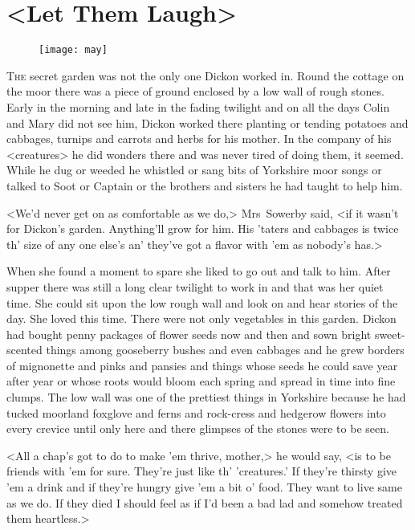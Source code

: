 \chapter{<Let Them Laugh>} 

\begin{figure}[t!]
\centering
\texttt{[image: may]}
\end{figure}

 \lettrine[]{T}{he} secret garden was not the only one Dickon worked in. Round the cottage on the moor there was a piece of ground enclosed by a low wall of rough stones. Early in the morning and late in the fading twilight and on all the days Colin and Mary did not see him, Dickon worked there planting or tending potatoes and cabbages, turnips and carrots and herbs for his mother. In the company of his <creatures> he did wonders there and was never tired of doing them, it seemed. While he dug or weeded he whistled or sang bits of Yorkshire moor songs or talked to Soot or Captain or the brothers and sisters he had taught to help him.

<We'd never get on as comfortable as we do,> Mrs~Sowerby said, <if it wasn't for Dickon's garden. Anything'll grow for him. His 'taters and cabbages is twice th' size of any one else's an' they've got a flavor with 'em as nobody's has.>

When she found a moment to spare she liked to go out and talk to him. After supper there was still a long clear twilight to work in and that was her quiet time. She could sit upon the low rough wall and look on and hear stories of the day. She loved this time. There were not only vegetables in this garden. Dickon had bought penny packages of flower seeds now and then and sown bright sweet-scented things among gooseberry bushes and even cabbages and he grew borders of mignonette and pinks and pansies and things whose seeds he could save year after year or whose roots would bloom each spring and spread in time into fine clumps. The low wall was one of the prettiest things in Yorkshire because he had tucked moorland foxglove and ferns and rock-cress and hedgerow flowers into every crevice until only here and there glimpses of the stones were to be seen.

<All a chap's got to do to make 'em thrive, mother,> he would say, <is to be friends with 'em for sure. They're just like th' 'creatures.' If they're thirsty give 'em a drink and if they're hungry give 'em a bit o' food. They want to live same as we do. If they died I should feel as if I'd been a bad lad and somehow treated them heartless.>

